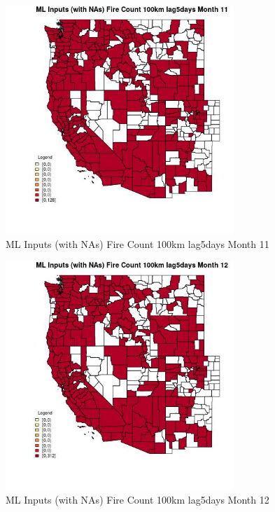 \begin{figure} 
\centering  
\includegraphics[width=0.77\textwidth]{Code_Outputs/Report_ML_input_PM25_Step4_part_e_de_duplicated_aves_compiled_2019-05-21wNAs_CountyFire_Count_100km_lag5daysmedianMonth11.jpg} 
\caption{\label{fig:Report_ML_input_PM25_Step4_part_e_de_duplicated_aves_compiled_2019-05-21wNAsCountyFire_Count_100km_lag5daysmedianMonth11}ML Inputs (with NAs) Fire Count 100km lag5days Month 11} 
\end{figure} 
 

\begin{figure} 
\centering  
\includegraphics[width=0.77\textwidth]{Code_Outputs/Report_ML_input_PM25_Step4_part_e_de_duplicated_aves_compiled_2019-05-21wNAs_CountyFire_Count_100km_lag5daysmedianMonth12.jpg} 
\caption{\label{fig:Report_ML_input_PM25_Step4_part_e_de_duplicated_aves_compiled_2019-05-21wNAsCountyFire_Count_100km_lag5daysmedianMonth12}ML Inputs (with NAs) Fire Count 100km lag5days Month 12} 
\end{figure} 
 

